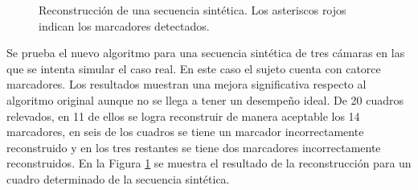 \begin{figure}[ht!]
   \caption{Reconstrucción de una secuencia sintética. Los asteriscos rojos indican los marcadores detectados.} 
   \label{img_reconstruccion_sintetica}    
\end{figure} 

 
Se prueba el nuevo algoritmo para una secuencia sintética de tres cámaras en las que se intenta simular el caso real. En este caso el sujeto cuenta con catorce marcadores. 
Los resultados muestran una mejora significativa respecto al algoritmo original
aunque no se llega a tener un desempeño ideal. 
De 20 cuadros relevados, en 11 de ellos se logra reconstruir de manera aceptable los 14 marcadores, en seis de los cuadros se tiene un marcador incorrectamente reconstruido y en los tres restantes se tiene dos marcadores incorrectamente reconstruidos.
En la Figura \ref{img_reconstruccion_sintetica} se muestra el resultado de la reconstrucción para un cuadro  determinado de la secuencia sintética.


